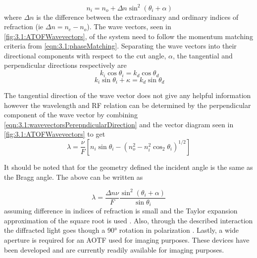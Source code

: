 \documentclass[12pt, draft]{article}
\begin{document}
 \begin{equation}
    \ n_{i} = n_{o} + \Delta n\sin^{2}(\theta_{i}+\alpha)
    \label{eqn:3.1:incomingIndexOfRefractionApprox}
\end{equation}
where $\Delta n$ is the difference between the extraordinary and ordinary indices of refraction (ie $\Delta n = n_{e} - n_{o}$). The wave vectors, seen in \autoref{fig:3.1:ATOFWavevectors}, of the system need to follow the momentum matching criteria from \autoref{eqn:3.1:phaseMatching}. Separating the wave vectors into their directional components with respect to the cut angle, $\alpha$, the tangential and perpendicular directions respectively are
\begin{equation}
    \ k_{i}\cos\theta_{i} = {k}_{d}\cos\theta_{d}
    \label{eqn:3.1:wavevectorsTangentalDirection}
\end{equation}
\begin{equation}
    \ k_{i}\sin\theta_{i} + \kappa = {k}_{d}\sin\theta_{d}
    \label{eqn:3.1:wavevectorsPerepndicularDirection}
\end{equation}

The tangential direction of the wave vector does not give any helpful information however the wavelength and RF relation can be determined by the perpendicular component of the wave vector by combining \autoref{eqn:3.1:wavevectorsPerepndicularDirection} and the vector diagram seen in \autoref{fig:3.1:ATOFWavevectors} to get
\begin{equation}
    \lambda  = \frac{\nu}{F}[n_{i}\sin\theta_{i}-(n_{o}^{2}-n_{i}^{2}\cos_{2}\theta_{i})^{1/2}]
    \label{eqn:3.1:initialAOTFWavelengthDependance}
\end{equation}

It should be noted that for the geometry defined the incident angle is the same as the Bragg angle. The above can be written as

\begin{equation}
    \lambda  = \frac{\Delta n\nu}{F}\frac{\sin^{2}(\theta_{i}+\alpha)}{\sin\theta_{i}}
    \label{eqn:3.1:AOTFWavelengthDependance}
\end{equation}
assuming difference in indices of refraction is small and the Taylor expansion approximation of the square root is used \citep{Voloshinov2006}. Also, through the described interaction the diffracted light goes though a 90\si{\degree} rotation in polarization \citep{Voloshinov1996}. Lastly, a wide aperture is required for an AOTF used for imaging purposes. These devices have been developed \citep{Gass1991} and are currently readily available for imaging purposes.
\end{document}
